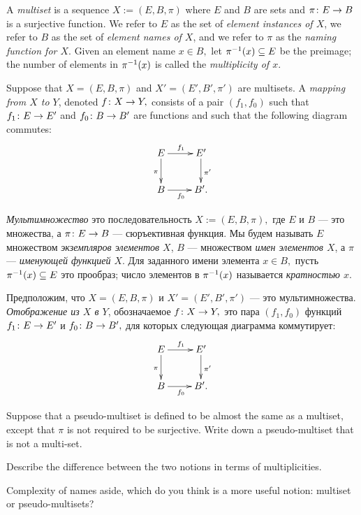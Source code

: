 \documentclass[CT4S-EN-RU]{subfiles}
\begin{document}
\begin{definitionENG}\label{def:multiset}
A {\em multiset} is a sequence $X:=(E,B,\pi)$ where $E$ and $B$ are sets and $\pi\colon E\rightarrow B$ is a surjective function. We refer to $E$ as the set of {\em element instances of $X$}, we refer to $B$ as the set of {\em element names of $X$}, and we refer to $\pi$ as the {\em naming function for $X$}. Given an element name $x\in B,$ let $\pi^\m1(x)\ss E$ be the preimage; the number of elements in $\pi^\m1(x)$ is called the {\em multiplicity of $x$}.

Suppose that $X=(E,B,\pi)$ and $X'=(E',B',\pi')$ are multisets. A {\em mapping from $X$ to $Y$}, denoted $f\colon X\rightarrow Y,$ consists of a pair $(f_1,f_0)$ such that $f_1\colon E\rightarrow E'$ and $f_0\colon B\rightarrow B'$ are functions and such that the following diagram commutes:
\begin{align}\label{dia:multiset map}
\xymatrix{E\ar[r]^{f_1}\ar[d]_{\pi}&E'\ar[d]^{\pi'}\\B\ar[r]_{f_0}&B'.}
\end{align}
\end{definitionENG}

\begin{definitionRUS}\label{def:multiset}
{\em Мультимножество} это последовательность $X:=(E,B,\pi),$ где $E$ и $B$ — это множества, а $\pi\colon E\rightarrow B$ — сюръективная функция. Мы будем называть $E$ множеством {\em экземпляров элементов $X$}, $B$ — множеством {\em имен элементов $X$}, а $\pi$ — {\em именующей функцией $X$}. Для заданного имени элемента $x\in B,$ пусть $\pi^\m1(x)\ss E$ это прообраз; число элементов в $\pi^\m1(x)$ называется {\em кратностью $x$}.

Предположим, что $X=(E,B,\pi)$ и $X'=(E',B',\pi')$ — это мультимножества. {\em Отображение из $X$ в $Y$}, обозначаемое $f\colon X\rightarrow Y,$ это пара $(f_1,f_0)$ функций $f_1\colon E\rightarrow E'$ и $f_0\colon B\rightarrow B',$ для которых следующая диаграмма коммутирует:
\begin{align}\label{dia:multiset map}
\xymatrix{E\ar[r]^{f_1}\ar[d]_{\pi}&E'\ar[d]^{\pi'}\\B\ar[r]_{f_0}&B'.}
\end{align}
\end{definitionRUS}

\begin{exerciseENG}
Suppose that a pseudo-multiset is defined to be almost the same as a multiset, except that $\pi$ is not required to be surjective. 
\sexc Write down a pseudo-multiset that is not a multi-set. 
\item Describe the difference between the two notions in terms of multiplicities. 
\item Complexity of names aside, which do you think is a more useful notion: multiset or pseudo-multisets? 
\endsexc
\end{exerciseENG}
\end{document}
